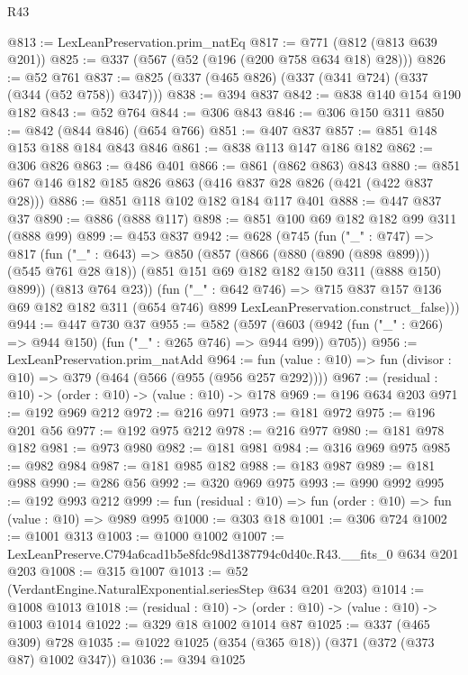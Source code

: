 \begin{lexlean}{R43}
\begin{coremodule}
@813 := LexLeanPreservation.prim_natEq
@817 := @771 (@812 (@813 @639 @201))
@825 := @337 (@567 (@52 (@196 (@200 @758 @634 @18) @28)))
@826 := @52 @761
@837 := @825 (@337 (@465 @826) (@337 (@341 @724) (@337 (@344 (@52 @758)) @347)))
@838 := @394 @837
@842 := @838 @140 @154 @190 @182
@843 := @52 @764
@844 := @306 @843
@846 := @306 @150 @311
@850 := @842 (@844 @846) (@654 @766)
@851 := @407 @837
@857 := @851 @148 @153 @188 @184 @843 @846
@861 := @838 @113 @147 @186 @182
@862 := @306 @826
@863 := @486 @401
@866 := @861 (@862 @863) @843
@880 := @851 @67 @146 @182 @185 @826 @863 (@416 @837 @28 @826 (@421 (@422 @837 @28)))
@886 := @851 @118 @102 @182 @184 @117 @401
@888 := @447 @837 @37
@890 := @886 (@888 @117)
@898 := @851 @100 @69 @182 @182 @99 @311 (@888 @99)
@899 := @453 @837
@942 := @628
    (@745
      (fun ("_" : @747) =>
      @817
        (fun ("_" : @643) =>
        @850
          (@857
            (@866 (@880 (@890 (@898 @899))) (@545 @761 @28 @18))
            (@851 @151 @69 @182 @182 @150 @311 (@888 @150) @899))
          (@813 @764 @23))
        (fun ("_" : @642 @746) =>
        @715
          @837
          @157
          @136
          @69
          @182
          @182
          @311
          (@654 @746)
          @899
          LexLeanPreservation.construct_false)))
@944 := @447 @730 @37
@955 := @582
    (@597 (@603 (@942 (fun ("_" : @266) => @944 @150) (fun ("_" : @265 @746) => @944 @99)) @705))
@956 := LexLeanPreservation.prim_natAdd
@964 := fun (value : @10) => fun (divisor : @10) => @379 (@464 (@566 (@955 (@956 @257 @292))))
@967 := (residual : @10) -> (order : @10) -> (value : @10) -> @178
@969 := @196 @634 @203
@971 := @192 @969 @212
@972 := @216 @971
@973 := @181 @972
@975 := @196 @201 @56
@977 := @192 @975 @212
@978 := @216 @977
@980 := @181 @978 @182
@981 := @973 @980
@982 := @181 @981
@984 := @316 @969 @975
@985 := @982 @984
@987 := @181 @985 @182
@988 := @183 @987
@989 := @181 @988
@990 := @286 @56
@992 := @320 @969 @975
@993 := @990 @992
@995 := @192 @993 @212
@999 := fun (residual : @10) => fun (order : @10) => fun (value : @10) => @989 @995
@1000 := @303 @18
@1001 := @306 @724
@1002 := @1001 @313
@1003 := @1000 @1002
@1007 := LexLeanPreserve.C794a6cad1b5e8fdc98d1387794c0d40c.R43.__fits_0 @634 @201 @203
@1008 := @315 @1007
@1013 := @52 (VerdantEngine.NaturalExponential.seriesStep @634 @201 @203)
@1014 := @1008 @1013
@1018 := (residual : @10) -> (order : @10) -> (value : @10) -> @1003 @1014
@1022 := @329 @18 @1002 @1014 @87
@1025 := @337 (@465 @309) @728
@1035 := @1022 @1025 (@354 (@365 @18)) (@371 (@372 (@373 @87) @1002 @347))
@1036 := @394 @1025

\end{coremodule}
\end{lexlean}

